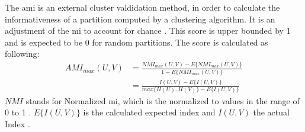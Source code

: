 The \acrshort{ami} is an external cluster valdidation method, in order to calculate the informativeness of a partition computed by a clustering algorithm. It is an adjustment of the \acrfull{mi} to account for chance \cite{scikitlearn}. This score is upper bounded by 1 and is expected to be 0 for random partitions. The score is calculated as following: \cite{ari_form}
\begin{align}
    AMI_{max}(U,V) &= \frac{NMI_{max}(U,V)-E\{NMI_{max}(U,V)\}}{1-E\{NMI_{max}(U,V)\}}\\ &= \frac{I(U,V)-E\{I(U,V)\}}{max\{H(U), H(V)\}-E\{I(U,V)\}}
\end{align}
$NMI$ stands for Normalized \acrshort{mi}, which is the  normalized to values in the range of 0 to 1 \cite{scikitlearn}. $E\{I(U,V)\}$ is the calculated expected index and $I(U,V)$ the actual Index \cite{ari_form}.